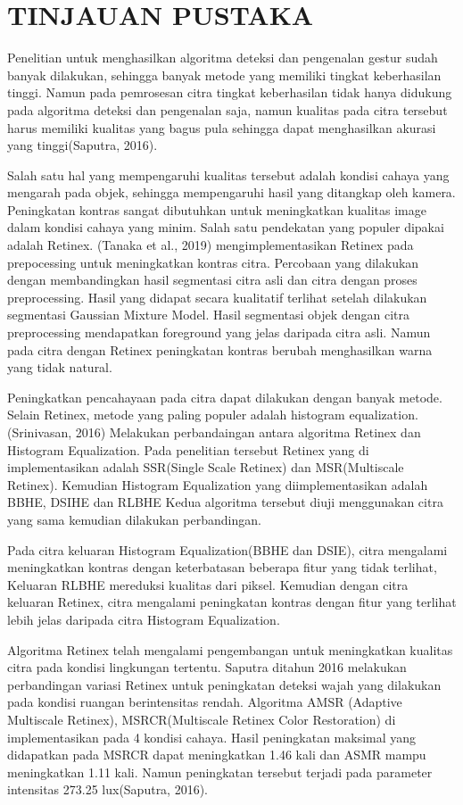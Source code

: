 \chapter{TINJAUAN PUSTAKA} 
Penelitian untuk menghasilkan algoritma deteksi dan pengenalan gestur sudah banyak dilakukan, sehingga banyak metode yang memiliki tingkat keberhasilan tinggi. Namun pada pemrosesan citra tingkat keberhasilan tidak hanya didukung pada algoritma deteksi dan pengenalan saja, namun kualitas pada citra tersebut harus memiliki kualitas yang bagus pula sehingga dapat menghasilkan akurasi yang tinggi(Saputra, 2016).

Salah satu hal yang mempengaruhi kualitas tersebut adalah kondisi cahaya yang mengarah pada objek, sehingga mempengaruhi hasil yang ditangkap oleh kamera. Peningkatan kontras sangat dibutuhkan untuk meningkatkan kualitas image dalam kondisi cahaya yang minim. Salah satu pendekatan yang populer dipakai adalah Retinex. (Tanaka et al., 2019) mengimplementasikan Retinex pada prepocessing untuk meningkatkan kontras citra. Percobaan yang dilakukan dengan membandingkan hasil segmentasi citra asli dan citra dengan proses preprocessing. Hasil yang didapat secara kualitatif terlihat setelah dilakukan segmentasi Gaussian Mixture Model. Hasil segmentasi objek dengan citra preprocessing mendapatkan foreground yang jelas daripada citra asli. Namun pada citra dengan Retinex peningkatan kontras berubah menghasilkan warna yang tidak natural.

Peningkatkan pencahayaan pada citra dapat dilakukan dengan banyak metode. Selain Retinex, metode yang paling populer adalah histogram equalization. (Srinivasan, 2016) Melakukan perbandaingan antara algoritma Retinex dan Histogram Equalization. Pada penelitian tersebut Retinex yang di implementasikan adalah SSR(Single Scale Retinex) dan MSR(Multiscale Retinex). Kemudian Histogram Equalization yang diimplementasikan adalah BBHE, DSIHE dan RLBHE Kedua algoritma tersebut diuji menggunakan citra yang sama kemudian dilakukan perbandingan. 

Pada citra keluaran Histogram Equalization(BBHE dan DSIE), citra mengalami meningkatkan kontras dengan keterbatasan beberapa fitur yang tidak terlihat, Keluaran RLBHE mereduksi kualitas dari piksel. Kemudian dengan citra keluaran Retinex, citra mengalami peningkatan kontras dengan fitur yang terlihat lebih jelas daripada citra Histogram Equalization.

Algoritma Retinex telah mengalami pengembangan untuk meningkatkan kualitas citra pada kondisi lingkungan tertentu. Saputra ditahun 2016 melakukan perbandingan variasi Retinex untuk peningkatan deteksi wajah yang dilakukan pada kondisi ruangan berintensitas rendah. Algoritma AMSR (Adaptive Multiscale Retinex), MSRCR(Multiscale Retinex Color Restoration) di implementasikan pada 4 kondisi cahaya. Hasil peningkatan maksimal yang didapatkan pada MSRCR dapat meningkatkan 1.46 kali dan ASMR mampu meningkatkan 1.11 kali. Namun peningkatan tersebut terjadi pada parameter intensitas 273.25 lux(Saputra, 2016).

